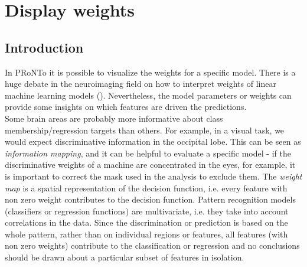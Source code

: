 %


\chapter{Display weights}
\label{chap:DisWeights}
\minitoc

\section{Introduction}

In PRoNTo it is possible to visualize the weights for a specific model. There is a huge debate in the neuroimaging field on how to interpret weights of linear machine learning models (\cite{haufe2014interpretation, Schrouff2018, schrouff2018interpreting, weichwald2015causal}).
Nevertheless, the model parameters or weights can provide some insights on which features are driven the predictions.
\\


Some brain areas are probably more informative about class membership/regression targets than others. For example, in a visual task, we would expect discriminative information in the occipital lobe. This can be seen as \textit{information mapping}, and it can be helpful to evaluate a specific model - if the discriminative weights of a machine are concentrated in the eyes, for example, it is important to correct the mask used in the analysis to exclude them. The \textit{weight map} is a spatial representation of the decision function, i.e. every feature with non zero weight contributes to the decision function. Pattern recognition models (classifiers or regression functions) are multivariate, i.e. they take into account correlations in the data. Since the discrimination or prediction is based on the whole pattern, rather than on individual regions or features, all features (with non zero weights) contribute to the classification or regression and no conclusions should be drawn about a particular subset of features in isolation.
\\

